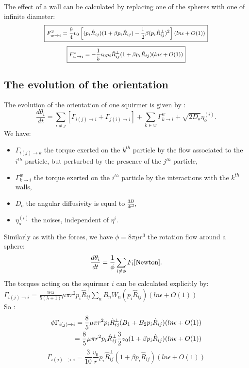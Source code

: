 \documentclass{article}
\begin{document}
The effect of a wall can be calculated by replacing one of the spheres with one of infinite diameter:
\begin{equation*}
    \footnotesize
    \boxed{F_{w\rightarrow i}^{y} = \frac{9}{4} v_0
    \left[(p_i\hat{R}_{ij})(1 + \beta p_i\hat{R}_{ij}) - \frac{1}{2}\beta(p_i\hat{R}^{\perp}_{ij})^2\right](ln \epsilon + O(1))}\\
\end{equation*}
\begin{equation*}
    \footnotesize
    \boxed{F_{w\rightarrow i}^{x} = -\frac{1}{5} v_0p_i\hat{R}^{\perp}_{ij}(1 + \beta p_i\hat{R}_{ij})(ln \epsilon + O(1))}
\end{equation*}

\subsection{The evolution of the orientation}
The evolution of the orientation of one squirmer is given by : 
$$
\boxed{\frac{d \theta_i}{dt} = \sum\limits_{i\ne j} \left[\Gamma_{i(j)\rightarrow i} + \Gamma_{j(i)\rightarrow i}\right] + \sum\limits_{k\in w} \Gamma_{k\rightarrow i}^w + \sqrt{2D_o} \eta_o^{(i)}}.
$$
We have:
\begin{itemize}
    \item $\Gamma_{i(j)\rightarrow k}$ the torque exerted on the $k^{th}$ particle by the flow associated to the $i^{th}$ particle, but perturbed by the presence of the $j^{th}$ particle,
    \item $\Gamma_{k\rightarrow i}^w$ the torque exerted on the $i^{th}$ particle by the interactions with the $k^{th}$ walls,
    \item $D_o$ the angular diffusivity is equal to $\frac{3D}{4r^2}$,
    \item $\eta_o^{(i)}$ the noises, independent of $\eta^{i}$.
\end{itemize}
\vspace{0.5cm}
Similarly as with the forces, we have $\phi = 8\pi\mu r^3$ the rotation flow around a sphere\cite{Stokes}:
$$\frac{d \theta_i}{dt} = \frac{1}{\phi}\sum\limits_{i \ne \phi}F_i\cite{Newton}.$$
The torques acting on the squirmer $i$ can be calculated explicitly by: \\
$\Gamma_{i(j)\rightarrow i}$ = $\frac{16 \lambda}{5(\lambda +1)} \mu \pi r^2 p_i\hat{R}_{ij}^{\perp}\sum_{n} B_n W_n(p_i\hat{R}_{ij}) (ln \epsilon + O(1))$ \cite{Brumley}
\\ So :
\begin{align*}
    \footnotesize
    \phi \Gamma_{i(j)\rightarrow i} = \frac{8}{5}\mu\pi r^2p_i\hat{R}_{ij}^{\perp}(B_1 + B_2 p_i\hat{R}_{ij})(ln \epsilon + O(1))\\
    = \frac{8}{5}\mu\pi r^2p_i\hat{R}_{ij}^{\perp}\frac{3}{2}v_0(1 + \beta p_i\hat{R}_{ij})(ln \epsilon + O(1))
\end{align*}
\begin{equation*}
    \boxed{\Gamma_{i(j)->i} = \frac{3}{10}\frac{v_0}{r}p_i\hat{R}_{ij}^{\perp}(1 + \beta p_i\hat{R}_{ij})(ln \epsilon + O(1))}
\end{equation*}
\end{document}
